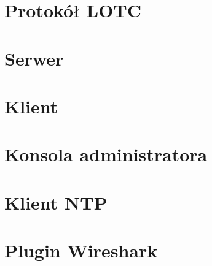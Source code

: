 \documentclass[10pt,a4paper]{article}
\begin{document}
    \section{Protokół LOTC}
    \section{Serwer}
    \section{Klient}
    \section{Konsola administratora}
    \section{Klient NTP}
    \section{Plugin Wireshark}
		
\end{document}
